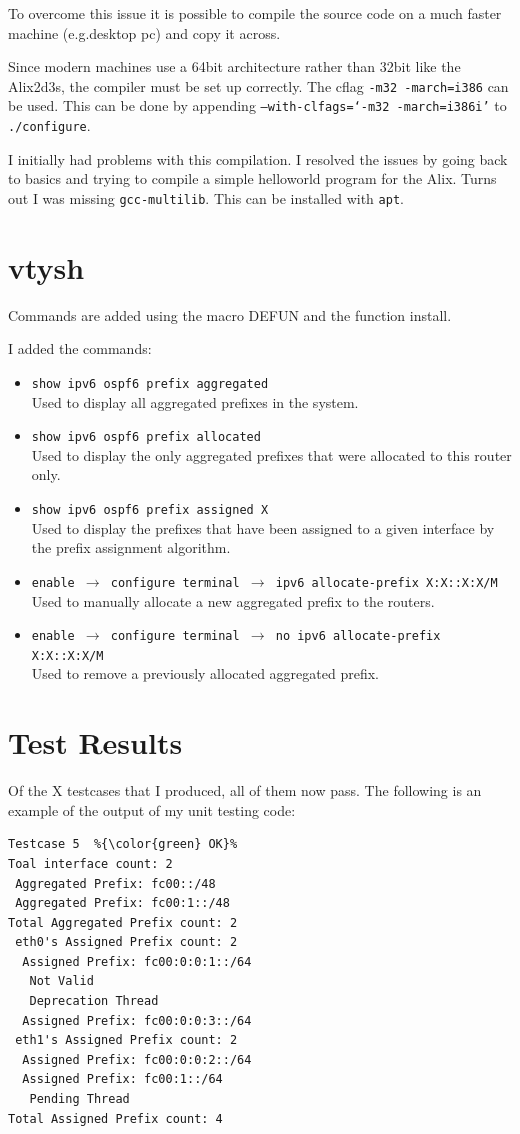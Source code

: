 To overcome this issue it is possible to compile the source code on a much
faster machine (e.g.\@ desktop pc) and copy it across. 

Since modern machines use a 64bit architecture rather than 32bit like the
Alix2d3s, the compiler must be set up correctly. The cflag \texttt{-m32
-march=i386} can be used. This can be done by appending
\texttt{--with-clfags=`-m32 -march=i386i'} to \texttt{\@./configure}.

I initially had problems with this compilation. I resolved the issues by going
back to basics and trying to compile a simple helloworld program for the Alix.
Turns out I was missing \texttt{gcc-multilib}. This can be installed with \texttt{apt}.

\chapter{vtysh}
\label{vtysh}
Commands are added using the macro DEFUN and the function install.

I added the commands:
\begin{itemize}
	\item \texttt{show ipv6 ospf6 prefix aggregated} \\
		Used to display all aggregated prefixes in the system.
	\item \texttt{show ipv6 ospf6 prefix allocated} \\ 
		Used to display the only aggregated prefixes that were allocated to this
		router only.
	\item \texttt{show ipv6 ospf6 prefix assigned X} \\
		Used to display the prefixes that have been assigned to a given interface
		by the prefix assignment algorithm. 


	\item \texttt{enable $\rightarrow$ configure terminal 
		$\rightarrow$ ipv6 allocate-prefix X:X::X:X/M} \\
		Used to manually allocate a new aggregated prefix to the routers.
	\item \texttt{enable $\rightarrow$ configure terminal
		$\rightarrow$ no ipv6 allocate-prefix X:X::X:X/M} \\
		Used to remove a previously allocated aggregated prefix.
\end{itemize}

\chapter{Test Results}
\label{testResults}
Of the X testcases that I produced, all of them now pass. The following is an
example of the output of my unit testing code: 

\begin{lstlisting}
Testcase 5  %{\color{green} OK}%
Toal interface count: 2 
 Aggregated Prefix: fc00::/48
 Aggregated Prefix: fc00:1::/48
Total Aggregated Prefix count: 2 
 eth0's Assigned Prefix count: 2
  Assigned Prefix: fc00:0:0:1::/64
   Not Valid
   Deprecation Thread
  Assigned Prefix: fc00:0:0:3::/64
 eth1's Assigned Prefix count: 2
  Assigned Prefix: fc00:0:0:2::/64
  Assigned Prefix: fc00:1::/64
   Pending Thread
Total Assigned Prefix count: 4 
\end{lstlisting}
